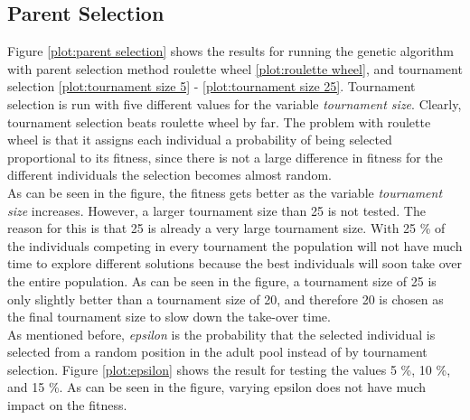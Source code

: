 \subsection{Parent Selection}
Figure \ref{plot:parent selection} shows the results for running the genetic algorithm with parent selection method roulette wheel \ref{plot:roulette wheel}, and tournament selection \ref{plot:tournament size 5} - \ref{plot:tournament size 25}. Tournament selection is run with five different values for the variable \textit{tournament size}. Clearly, tournament selection beats roulette wheel by far. The problem with roulette wheel is that it assigns each individual a probability of being selected proportional to its fitness, since there is not a large difference in fitness for the different individuals the selection becomes almost random. \\


\noindent As can be seen in the figure, the fitness gets better as the variable \textit{tournament size} increases. However, a larger tournament size than 25 is not tested. The reason for this is that 25 is already a very large tournament size. With 25 \% of the individuals competing in every tournament the population will not have much time to explore different solutions because the best individuals will soon take over the entire population. As can be seen in the figure, a tournament size of 25 is only slightly better than a tournament size of 20, and therefore 20 is chosen as the final tournament size to slow down the take-over time. \\


\noindent As mentioned before, \textit{epsilon} is the probability that the selected individual is selected from a random position in the adult pool instead of by tournament selection. Figure \ref{plot:epsilon} shows the result for testing the values 5 \%, 10 \%, and 15 \%. As can be seen in the figure, varying epsilon does not have much impact on the fitness.\\


